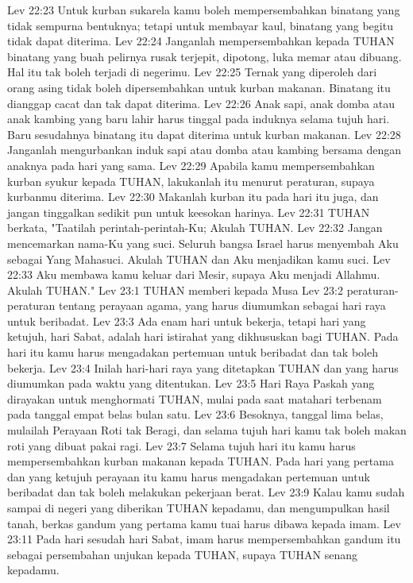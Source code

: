 Lev 22:23  Untuk kurban sukarela kamu boleh mempersembahkan binatang yang tidak sempurna bentuknya; tetapi untuk membayar kaul, binatang yang begitu tidak dapat diterima.
Lev 22:24  Janganlah mempersembahkan kepada TUHAN binatang yang buah pelirnya rusak terjepit, dipotong, luka memar atau dibuang. Hal itu tak boleh terjadi di negerimu.
Lev 22:25  Ternak yang diperoleh dari orang asing tidak boleh dipersembahkan untuk kurban makanan. Binatang itu dianggap cacat dan tak dapat diterima.
Lev 22:26  Anak sapi, anak domba atau anak kambing yang baru lahir harus tinggal pada induknya selama tujuh hari. Baru sesudahnya binatang itu dapat diterima untuk kurban makanan.
Lev 22:28  Janganlah mengurbankan induk sapi atau domba atau kambing bersama dengan anaknya pada hari yang sama.
Lev 22:29  Apabila kamu mempersembahkan kurban syukur kepada TUHAN, lakukanlah itu menurut peraturan, supaya kurbanmu diterima.
Lev 22:30  Makanlah kurban itu pada hari itu juga, dan jangan tinggalkan sedikit pun untuk keesokan harinya.
Lev 22:31  TUHAN berkata, "Taatilah perintah-perintah-Ku; Akulah TUHAN.
Lev 22:32  Jangan mencemarkan nama-Ku yang suci. Seluruh bangsa Israel harus menyembah Aku sebagai Yang Mahasuci. Akulah TUHAN dan Aku menjadikan kamu suci.
Lev 22:33  Aku membawa kamu keluar dari Mesir, supaya Aku menjadi Allahmu. Akulah TUHAN."
Lev 23:1  TUHAN memberi kepada Musa
Lev 23:2  peraturan-peraturan tentang perayaan agama, yang harus diumumkan sebagai hari raya untuk beribadat.
Lev 23:3  Ada enam hari untuk bekerja, tetapi hari yang ketujuh, hari Sabat, adalah hari istirahat yang dikhususkan bagi TUHAN. Pada hari itu kamu harus mengadakan pertemuan untuk beribadat dan tak boleh bekerja.
Lev 23:4  Inilah hari-hari raya yang ditetapkan TUHAN dan yang harus diumumkan pada waktu yang ditentukan.
Lev 23:5  Hari Raya Paskah yang dirayakan untuk menghormati TUHAN, mulai pada saat matahari terbenam pada tanggal empat belas bulan satu.
Lev 23:6  Besoknya, tanggal lima belas, mulailah Perayaan Roti tak Beragi, dan selama tujuh hari kamu tak boleh makan roti yang dibuat pakai ragi.
Lev 23:7  Selama tujuh hari itu kamu harus mempersembahkan kurban makanan kepada TUHAN. Pada hari yang pertama dan yang ketujuh perayaan itu kamu harus mengadakan pertemuan untuk beribadat dan tak boleh melakukan pekerjaan berat.
Lev 23:9  Kalau kamu sudah sampai di negeri yang diberikan TUHAN kepadamu, dan mengumpulkan hasil tanah, berkas gandum yang pertama kamu tuai harus dibawa kepada imam.
Lev 23:11  Pada hari sesudah hari Sabat, imam harus mempersembahkan gandum itu sebagai persembahan unjukan kepada TUHAN, supaya TUHAN senang kepadamu.
